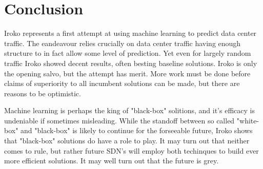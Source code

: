 \section{Conclusion}
\label{sec:conclusion}

Iroko represents a first attempt at using machine learning
to predict data center traffic. The eandeavour relies crucially
on data center traffic having enough structure to in fact allow
some level of prediction. Yet even for largely random traffic
Iroko showed decent results, often besting baseline solutions.
Iroko is only the opening salvo, but the attempt has merit. 
More work must be done before claims of superiority to all
incumbent solutions can be made, but there are reasons to be
optimistic. 

Machine learning is perhaps the king of "black-box" solitions, 
and it's efficacy is undeniable if sometimes misleading. While
the standoff between so called "white-box" and "black-box" is 
likely to continue for the forseeable future, Iroko shows
that "black-box" solutions do have a role to play. It may turn
out that neither comes to rule, but rather future SDN's will 
employ both techinques to build ever more efficient solutions.
It may well turn out that the future is grey.



